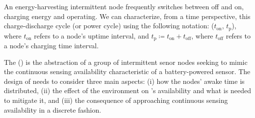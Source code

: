 An energy-harvesting intermittent node frequently switches between off and on, charging energy and operating. We can characterize, from a time perspective, this charge-discharge cycle (or power cycle) using the following notation: ($t_\text{on}$, $t_\text{p}$), where $t_\text{on}$ refers to a node's uptime interval, and $t_\text{p} \coloneqq t_\text{on} + t_\text{off}$, where $t_\text{off}$ refers to a node's charging time interval.

The \fullsys (\sys) is the abstraction of a group of intermittent senor nodes seeking to mimic the continuous sensing availability characteristic of a battery-powered sensor. 
%
The design of \sys needs to consider three main aspects: (i) how the nodes' awake time is distributed, (ii) the effect of the environment on \sys's availability and what is needed to mitigate it, and (iii) the consequence of approaching continuous sensing availability in a discrete fashion.  
%



